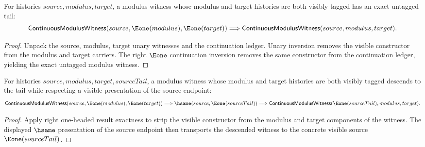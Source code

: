 \begin{theorem}
\label{thm:continuous-modulus-witness-right-e1-result-exactness}
For histories $source,modulus,target$, a modulus witness whose modulus and
target histories are both visibly tagged has an exact untagged tail:
$$
\mathsf{ContinuousModulusWitness}(source,\Eone(modulus),\Eone(target))
\Longrightarrow
\mathsf{ContinuousModulusWitness}(source,modulus,target).
$$
\end{theorem}
\begin{proof}
Unpack the source, modulus, target unary witnesses and the continuation
ledger. Unary inversion removes the visible constructor from the modulus and
target carriers. The right $\Eone$ continuation inversion removes the same
constructor from the continuation ledger, yielding the exact untagged modulus
witness.
\end{proof}

\begin{theorem}
\label{thm:continuous-modulus-witness-right-e1-visible-source-exactness}
For histories $source,modulus,target,sourceTail$, a modulus witness whose
modulus and target histories are both visibly tagged descends to the tail while
respecting a visible presentation of the source endpoint:
$$
\mathsf{ContinuousModulusWitness}(source,\Eone(modulus),\Eone(target))
\Longrightarrow
\hsame(source,\Eone(sourceTail))
\Longrightarrow
\mathsf{ContinuousModulusWitness}(\Eone(sourceTail),modulus,target).
$$
\end{theorem}
\begin{proof}
Apply right one-headed result exactness to strip the visible constructor from
the modulus and target components of the witness. The displayed $\hsame$
presentation of the source endpoint then transports the descended witness to
the concrete visible source $\Eone(sourceTail)$.
\end{proof}

